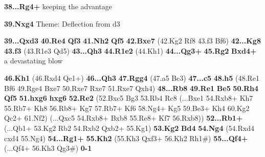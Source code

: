 \documentclass{article}
\begin{document}
\begin{multicols}{2}
\textbf{38...}\textbf{Rg4+} \newline keeping the advantage \par \textbf{39.}\textbf{Nxg4} \newline Theme: Deflection from d3 \par \textbf{39...}\textbf{Qxd3} \textbf{40.}\textbf{Re4} \textbf{Qf3} \textbf{41.}\textbf{Nh2} \textbf{Qf5} \textbf{42.}\textbf{Bxe7} (42.Kg2 Rf8 43.f3 Bf6) \textbf{42...}\textbf{Kg8} \textbf{43.}\textbf{f3} (43.R1e3 Qd5) \textbf{43...}\textbf{Qh3} \textbf{44.}\textbf{R1e2} (44.Kh1) \textbf{44...}\textbf{Qg3+} \textbf{45.}\textbf{Rg2} \textbf{Bxd4+} \newline a devastating blow \par \textbf{46.}\textbf{Kh1} (46.Rxd4 Qe1+) \textbf{46...}\textbf{Qh3} \textbf{47.}\textbf{Rgg4} (47.a5 Bc3) \textbf{47...}\textbf{c5} \textbf{48.}\textbf{h5} (48.Re1 Bf6 49.Rge4 Bxe7 50.Rxe7 Rxe7 51.Rxe7 Qxh4) \textbf{48...}\textbf{Rb8} \textbf{49.}\textbf{Re1} \textbf{Be5} \textbf{50.}\textbf{Rh4} \textbf{Qf5} \textbf{51.}\textbf{hxg6} \textbf{hxg6} \textbf{52.}\textbf{Re2} (52.Bxc5 Bg3 53.Rb4 Rc8 (...Bxe1 54.Rxb8+ Kh7 55.Rb7+ Kh8 56.Rb8+ Kg7 57.Rb7+ Kf6 58.Ng4+ Kg5 59.Be3+ Kh4 60.Kg2 Qc2+ 61.Nf2) (...Qxc5 54.Rxb8+ Bxb8 55.Re8+ Kf7 56.Rxb8)) \textbf{52...}\textbf{Rb1+} (...Qb1+ 53.Kg2 Rb2 54.Rxb2 Qxb2+ 55.Kg1) \textbf{53.}\textbf{Kg2} \textbf{Bd4} \textbf{54.}\textbf{Ng4} (54.Rxd4 cxd4 55.Ng4) \textbf{54...}\textbf{Rg1+} \textbf{55.}\textbf{Kh2} (55.Kh3 Qxf3+ 56.Kh2 Rh1\#) \textbf{55...}\textbf{Qf4+} (...Qf4+ 56.Kh3 Qg3\#) \textbf{0-1}
\end{multicols}
\end{document}
